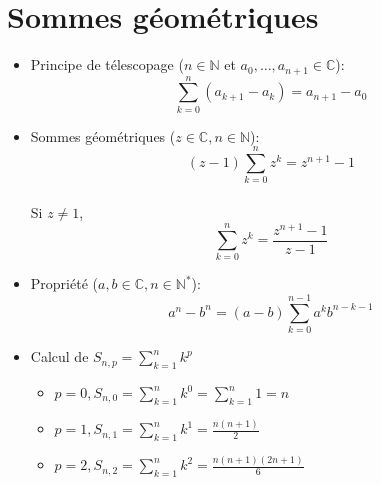 \documentclass[fleqn]{article}
\theoremstyle{definition} \newtheorem*{defi}{D\'efinition}
\theoremstyle{definition} \newtheorem*{theo}{Th\'eor\`eme}
\begin{document}
\section{Sommes g\'eom\'etriques}
\begin{itemize}
	\item Principe de t\'elescopage (\(n \in \mathbb{N}\) et \(a_0, \hdots, a_{n+1} \in \mathbb{C}\)): \\
		\[\sum_{k=0}^{n} (a_{k+1} - a_k) = a_{n+1} - a_0\]
	\item Sommes g\'eom\'etriques (\(z \in \mathbb{C}, n \in \mathbb{N}\)):
		\[(z-1)\sum_{k=0}^{n}z^k = z^{n+1} -1\] \\
		Si \(z \neq 1\), \\
		\[\sum_{k=0}^{n}z^k=\frac{z^{n+1}-1}{z-1}\]
	\item Propri\'{e}t\'{e} (\(a,b \in \mathbb{C}, n \in \mathbb{N}^*\)): \\
		\[a^n-b^n = (a-b)\sum_{k=0}^{n-1}a^kb^{n-k-1}\]
	\item Calcul de \(S_{n,p} = \sum_{k=1}^{n}k^p\) \\
		\begin{itemize}
			\item \(p = 0, S_{n,0} = \sum_{k=1}^{n}k^0 = \sum_{k=1}^{n}1 = n\)
			\item \(p = 1, S_{n,1} = \sum_{k=1}^{n}k^1 = \frac{n(n+1)}{2} \)
			\item \(p = 2, S_{n,2} = \sum_{k=1}^{n}k^2 = \frac{n(n+1)(2n+1)}{6} \)
		\end{itemize}
\end{itemize}
\end{document}
